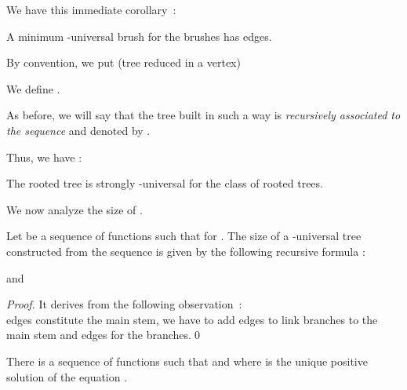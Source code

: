 \documentclass{llncs}
\begin{document}
We have this immediate corollary~:


\begin{corollary} A minimum -universal brush for the brushes has
 edges.
\end{corollary}




By convention, we put  (tree reduced in a vertex)

We define .





As before, we will say that the tree built in such a way is\textit{ recursively associated to the sequence } and denoted by
.





Thus, we have :





\begin{theorem} The rooted tree  is strongly -universal
for the class of rooted trees.
\end{theorem}




We now analyze the size of .





\begin{proposition} Let  be a
sequence of functions such that  for . The
size of a -universal tree constructed from the sequence is
given by the following recursive formula :

 and 
\end{proposition}




\begin{proof}It derives from the following observation~:\\
\noindent  edges constitute the main stem, we have to add  edges to link branches to the main stem and  edges for the branches.\qed
\end{proof}



\begin{theorem} There is a sequence of functions  such that  and  where  is the unique
positive solution of the equation .
\end{theorem}
\end{document}
